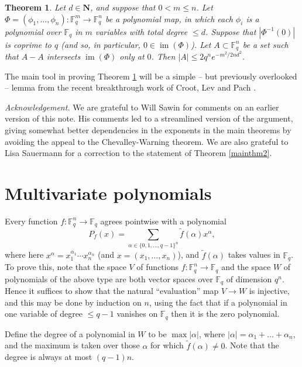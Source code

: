 \documentclass[12pt,reqno]{amsart}
\newtheorem{theorem}{Theorem}[section]
\theoremstyle{definition}
\renewcommand{\leq}{\leqslant}
\newcommand\im{\operatorname{im}}
\def\F{\mathbb{F}}
\def\N{\mathbf{N}}
\numberwithin{equation}{section}
\begin{document}
\begin{theorem}\label{mainthm3}
Let $d \in \N$, and suppose that $0 < m \leq n$. Let $\Phi = (\phi_1,\dots, \phi_n) : \F_q^m \rightarrow \F_q^n$ be a polynomial map, in which each $\phi_i$ is a polynomial over $\F_q$ in $m$ variables with total degree $\leq d$. Suppose that $|\Phi^{-1}(0)|$ is coprime to $q$ \textup{(}and so, in particular, $0 \in \im(\Phi)$\textup{)}. Let $A \subset \F_q^n$ be a set such that $A - A$ intersects $\im (\Phi)$ only at $0$. Then $|A| \leq 2q^{n}e^{-m^2/2nd^2}$.
\end{theorem}


The main tool in proving Theorem \ref{mainthm3} will be a simple -- but previously overlooked -- lemma from the recent breakthrough work of Croot, Lev and Pach \cite{croot-lev-pach}.

\emph{Acknowledgement.} We are grateful to Will Sawin for comments on an earlier version of this note. His comments led to a streamlined version of the argument, giving somewhat better dependencies in the exponents in the main theorems by avoiding the appeal to the Chevalley-Warning theorem. We are also grateful to Lisa Sauermann for a correction to the statement of Theorem \ref{mainthm2}.


\section{Multivariate polynomials}

Every function $f : \F_q^n \rightarrow \F_q$ agrees pointwise with a polynomial
\begin{equation}\label{eq17} P_f(x) =  \sum_{\alpha \in \{0,1,\dots, q-1\}^n} \tilde f(\alpha) x^{\alpha},\end{equation}
where here $x^{\alpha} = x_1^{\alpha_1} \cdots x_n^{\alpha_n}$ (and $x = (x_1,\dots, x_n)$), and $\tilde f(\alpha)$ takes values in $\F_q$. To prove this, note that the space $V$ of functions $f : \F_q^n \rightarrow \F_q$ and the space $W$ of polynomials of the above type are both vector spaces over $\F_q$ of dimension $q^n$. Hence it suffices to show that the natural ``evaluation'' map $V \rightarrow W$ is injective, and this may be done by induction on $n$, using the fact that if a polynomial in one variable of degree $\leq q - 1$ vanishes on $\F_q$ then it is the zero polynomial. 

Define the degree of a polynomial in $W$ to be $\max |\alpha|$, where $|\alpha| = \alpha_1 + \dots + \alpha_n$, and the maximum is taken over those $\alpha$ for which $\tilde f(\alpha) \neq 0$. Note that the degree is always at most $(q - 1)n$.
\end{document}
